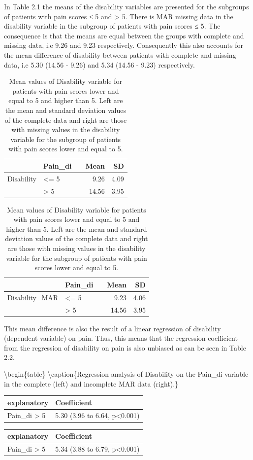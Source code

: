 \documentclass[
]{book}
\begin{document}
In Table 2.1 the means of the disability variables are presented for the
subgroups of patients with pain scores ≤ 5 and \textgreater{} 5. There
is MAR missing data in the disability variable in the subgroup of
patients with pain scores ≤ 5. The consequence is that the means are
equal between the groups with complete and missing data, i.e 9.26 and
9.23 respectively. Consequently this also accounts for the mean
difference of disability between patients with complete and missing
data, i.e 5.30 (14.56 - 9.26) and 5.34 (14.56 - 9.23) respectively.

\begin{table}
\caption{\label{tab:unnamed-chunk-52}Mean values of Disability variable for patients with pain scores lower and equal to 5 and higher than 5. Left are the mean and standard deviation values of the complete data and right are those with missing values in the disability variable for the subgroup of patients with pain scores lower and equal to 5.}

\centering
\begin{tabular}[t]{l|l|l|r|r}
\hline
  & Pain\_di &   & Mean & SD\\
\hline
Disability & <= 5 &  & 9.26 & 4.09\\
\hline
 & > 5 &  & 14.56 & 3.95\\
\hline
\end{tabular}
\centering
\begin{tabular}[t]{l|l|l|r|r}
\hline
  & Pain\_di &   & Mean & SD\\
\hline
Disability\_MAR & <= 5 &  & 9.23 & 4.06\\
\hline
 & > 5 &  & 14.56 & 3.95\\
\hline
\end{tabular}
\end{table}

This mean difference is also the result of a linear regression of
disability (dependent variable) on pain. Thus, this means that the
regression coefficient from the regression of disability on pain is also
unbiased as can be seen in Table 2.2.

\textbackslash begin\{table\}
\textbackslash caption\{\label{tab:unnamed-chunk-53}Regression analysis
of Disability on the Pain\_di variable in the complete (left) and
incomplete MAR data (right).\}

\centering
\begin{tabular}[t]{l|l}
\hline
explanatory & Coefficient\\
\hline
Pain\_di > 5 & 5.30 (3.96 to 6.64, p<0.001)\\
\hline
\end{tabular}
\centering
\begin{tabular}[t]{l|l}
\hline
explanatory & Coefficient\\
\hline
Pain\_di > 5 & 5.34 (3.88 to 6.79, p<0.001)\\
\hline
\end{tabular}
\end{document}
